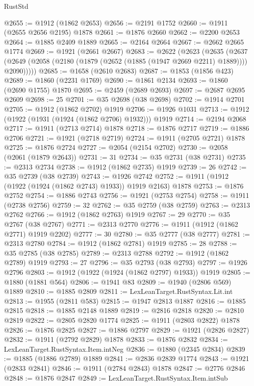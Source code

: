 \begin{lexlean}{RustStd}
\begin{coremodule}
@2655 := @1912 (@1862 @2653)
@2656 := @2191 @1752
@2660 := @1911 (@2655 @2656 @2195) @1878
@2661 := @1876 @2660
@2662 := @2200 @2653
@2664 := @1885 @2409 @1889
@2665 := @2164 @2664
@2667 := @2662 @2665 @1774
@2669 := @1921 (@2661 @2667)
@2683 := @2622
    (@2623
      (@2635
        (@2637 (@2649 (@2058 (@2180 (@1879 (@2652 (@1885 (@1947 @2669 @2211) @1889)))) @2090)))))
@2685 := @1658 (@2610 @2683)
@2687 := @1853 (@1856 @423)
@2689 := @1860 (@2231 @1769)
@2690 := @1861 @2134
@2693 := @1860 (@2690 @1755) @1870
@2695 := @2459 (@2689 @2693)
@2697 := @2687 @2695 @2609
@2698 := 25
@2701 := @35 @2698 (@38 @2698)
@2702 := @1914 @2701
@2705 := @1912 (@1862 @2702) @1919
@2706 := @1926 @1031
@2713 := @1912 (@1922 (@1931 (@1924 (@1862 @2706) @1932))) @1919
@2714 := @2194 @2068
@2717 := @1911 (@2713 @2714) @1878
@2718 := @1876 @2717
@2719 := @1886 @2706
@2721 := @1921 (@2718 @2719)
@2724 := @1911 (@2705 @2721) @1878
@2725 := @1876 @2724
@2727 := @2054 (@2154 @2702)
@2730 := @2058 (@2061 (@1879 @2643))
@2731 := 31
@2734 := @35 @2731 (@38 @2731)
@2735 := @2313 @2734
@2738 := @1912 (@1862 @2735) @1919
@2739 := 26
@2742 := @35 @2739 (@38 @2739)
@2743 := @1926 @2742
@2752 := @1911 (@1912 (@1922 (@1924 (@1862 @2743) @1933)) @1919 @2163) @1878
@2753 := @1876 @2752
@2754 := @1886 @2743
@2756 := @1921 (@2753 @2754)
@2758 := @1911 (@2738 @2756)
@2759 := 32
@2762 := @35 @2759 (@38 @2759)
@2763 := @2313 @2762
@2766 := @1912 (@1862 @2763) @1919
@2767 := 29
@2770 := @35 @2767 (@38 @2767)
@2771 := @2313 @2770
@2776 := @1911 (@1912 (@1862 @2771) @1919 @2202)
@2777 := 30
@2780 := @35 @2777 (@38 @2777)
@2781 := @2313 @2780
@2784 := @1912 (@1862 @2781) @1919
@2785 := 28
@2788 := @35 @2785 (@38 @2785)
@2789 := @2313 @2788
@2792 := @1912 (@1862 @2789) @1919
@2793 := 27
@2796 := @35 @2793 (@38 @2793)
@2797 := @1926 @2796
@2803 := @1912 (@1922 (@1924 (@1862 @2797) @1933)) @1919
@2805 := @1880 (@1881 @564)
@2806 := @1941 @83
@2809 := @1940 (@2806 @569) @1889
@2810 := @1885 @2809
@2811 := LexLeanTarget.RustSyntax.Lit.int
@2813 := @1955 (@2811 @583)
@2815 := @1947 @2813 @1887
@2816 := @1885 @2815
@2818 := @1885 @2148 @1889
@2819 := @2816 @2818
@2820 := @2810 @2819
@2822 := @2805 @2820 @1774
@2825 := @1911 (@2803 @2822) @1878
@2826 := @1876 @2825
@2827 := @1886 @2797
@2829 := @1921 (@2826 @2827)
@2832 := @1911 (@2792 @2829) @1878
@2833 := @1876 @2832
@2834 := LexLeanTarget.RustSyntax.Item.intNeg
@2836 := @1880 (@2345 @2834)
@2839 := @1885 (@1886 @2789) @1889
@2841 := @2836 @2839 @1774
@2843 := @1921 (@2833 @2841)
@2846 := @1911 (@2784 @2843) @1878
@2847 := @2776 @2846
@2848 := @1876 @2847
@2849 := LexLeanTarget.RustSyntax.Item.intSub

\end{coremodule}
\end{lexlean}
